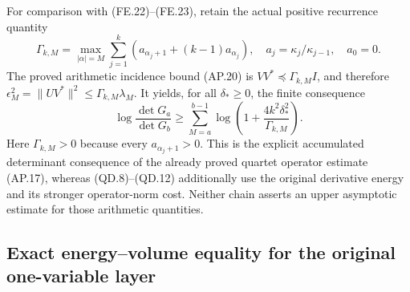 For comparison with (FE.22)--(FE.23), retain the actual positive
recurrence quantity
\[
 \Gamma_{k,M}=\max_{|\alpha|=M}\sum_{j=1}^k
       \left(a_{\alpha_j+1}+(k-1)a_{\alpha_j}\right),
 \quad a_j=\kappa_j/\kappa_{j-1},\quad a_0=0.
\]
The proved arithmetic incidence bound (AP.20) is
\(VV^*\preceq\Gamma_{k,M}I\), and therefore
\(\epsilon_M^2=\|UV^*\|^2\leq\Gamma_{k,M}\lambda_M\).
It yields, for all \(\delta_*\geq0\), the finite consequence
\[
 \log\frac{\det G_a}{\det G_b}
 \geq\sum_{M=a}^{b-1}\log\left(1+
                             \frac{4k^2\delta_*^2}{\Gamma_{k,M}}\right).
                                                                    \tag{QD.13}
\]
Here \(\Gamma_{k,M}>0\) because every \(a_{\alpha_j+1}>0\).
This is the explicit accumulated determinant consequence of the
already proved quartet operator estimate (AP.17), whereas
(QD.8)--(QD.12) additionally use the original derivative energy
and its stronger operator-norm cost.  Neither chain asserts an
upper asymptotic estimate for those arithmetic quantities.

\subsection{Exact energy--volume equality for the original one-variable layer}

